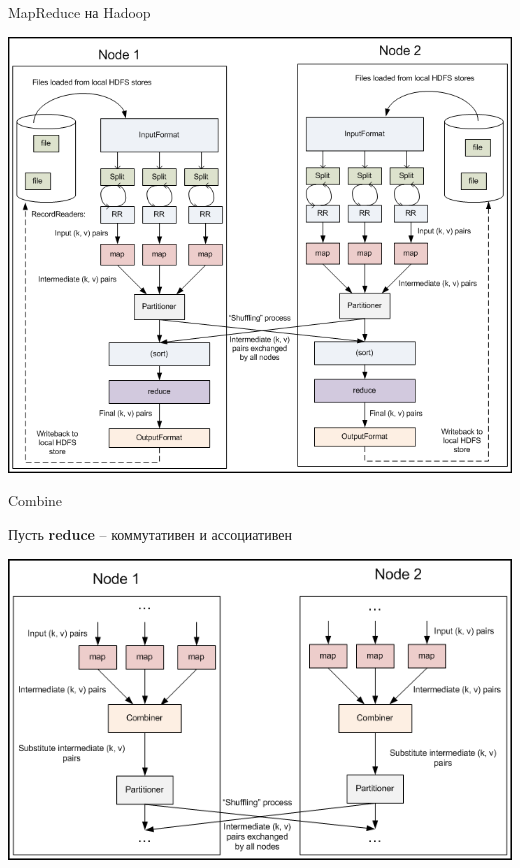 \documentclass[10pt,a4paper]{beamer}
\begin{document}
\begin{frame}{MapReduce на Hadoop}

\vspace{-1em}
\begin{center}
\includegraphics[scale=0.33]{images/hmr.png}
\end{center}

\end{frame}


\begin{frame}{Combine}

Пусть {\bf reduce} -- коммутативен и ассоциативен

\begin{center}
\includegraphics[scale=0.33]{images/combine.png}
\end{center}

\end{frame}
\end{document}
